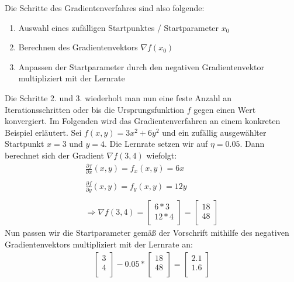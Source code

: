   \noindent
  Die Schritte des Gradientenverfahres sind also folgende: 
  \begin{enumerate}
    \item Auswahl eines zufälligen Startpunktes / Startparameter $x_{0}$
    \item Berechnen des Gradientenvektors $\nabla f(x_{0})$
    \item Anpassen der Startparameter durch den negativen Gradientenvektor multipliziert mit der Lernrate
  \end{enumerate}
  \bigbreak\noindent
  Die Schritte 2. und 3. wiederholt man nun eine feste Anzahl an Iterationsschritten oder bis die Ursprungsfunktion $f$ gegen einen Wert konvergiert.
  \bigbreak\noindent
  Im Folgenden wird das Gradientenverfahren an einem konkreten Beispiel erläutert.
  Sei $f(x,y) = 3x^2 + 6y^2$ und ein zufällig ausgewählter Startpunkt $x = 3$ und $y = 4$. 
  Die Lernrate setzen wir auf $\eta = 0.05$. Dann berechnet sich der Gradient $\nabla f(3,4)$ wiefolgt: 
  \begin{align*}
    \frac{\partial f}{\partial x}(x,y) = f_{x}(x,y) = 6x\\
    \\
    \frac{\partial f}{\partial y}(x,y) = f_{y}(x,y) = 12y\\
    \\
    \Rightarrow \nabla f(3,4) = \begin{bmatrix}
      6 * 3\\
      12 * 4\\
    \end{bmatrix} = \begin{bmatrix}
      18\\
      48\\
    \end{bmatrix}
  \end{align*}
  Nun passen wir die Startparameter gemäß der Vorschrift mithilfe des negativen Gradientenvektors multipliziert mit der Lernrate an: 
  \begin{align*}
    \begin{bmatrix}
      3\\
      4\\
    \end{bmatrix} - 0.05 * \begin{bmatrix}
      18\\
      48\\
    \end{bmatrix} = \begin{bmatrix}
      2.1\\
      1.6\\
    \end{bmatrix}
  \end{align*}
